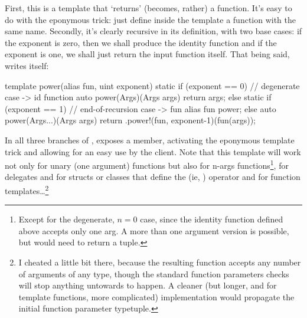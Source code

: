 First, this is a template that `returns' (becomes, rather) a function. It's easy to do with the eponymous trick: just define inside the template a function with the same name. Secondly, it's clearly recursive in its definition, with two base cases: if the exponent is zero, then we shall produce the identity function and if the exponent is one, we shall just return the input function itself. That being said,  writes itself:

\begin{dcode}
template power(alias fun, uint exponent)
{
    static if (exponent == 0) // degenerate case -> id function
        auto power(Args)(Args args) { return args; }
    else static if (exponent == 1) // end-of-recursion case -> fun
        alias fun power;
    else
        auto power(Args...)(Args args) 
        {
            return .power!(fun, exponent-1)(fun(args));
        }
}
\end{dcode}


In all three branches of ,  exposes a  member, activating the eponymous template trick and allowing for an easy use by the client. Note that this template will work not only for unary (one argument) functions but also for n-args functions\footnote{ Except for the degenerate, $n = 0$ case, since the identity function defined above accepts only one arg. A more than one argument version is possible, but would need to return a tuple.}, for delegates and for structs or classes that define the \DD{()}(ie, ) operator and for function templates\ldots\footnote{ I cheated a little bit there, because the resulting function accepts any number of arguments of any type, though the standard function parameters checks will stop anything untowards to happen. A cleaner (but longer, and for template functions, more complicated) implementation would propagate the initial function parameter typetuple.}

